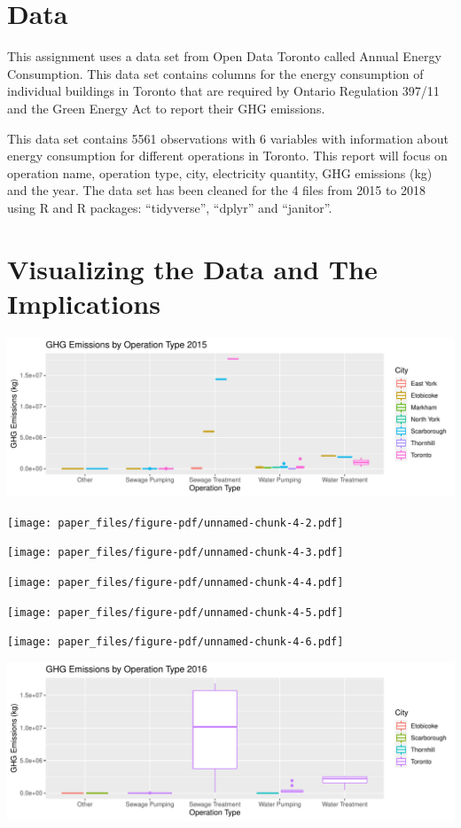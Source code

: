 \documentclass[
  letterpaper,
  DIV=11,
  numbers=noendperiod]{scrartcl}
\begin{document}
\pagebreak

\hypertarget{data}{%
\section{Data}\label{data}}

This assignment uses a data set from Open Data Toronto called Annual
Energy Consumption. This data set contains columns for the energy
consumption of individual buildings in Toronto that are required by
Ontario Regulation 397/11 and the Green Energy Act to report their GHG
emissions.

This data set contains 5561 observations with 6 variables with
information about energy consumption for different operations in
Toronto. This report will focus on operation name, operation type, city,
electricity quantity, GHG emissions (kg) and the year. The data set has
been cleaned for the 4 files from 2015 to 2018 using R and R packages:
``tidyverse'', ``dplyr'' and ``janitor''.

\hypertarget{visualizing-the-data-and-the-implications}{%
\section{Visualizing the Data and The
Implications}\label{visualizing-the-data-and-the-implications}}

\includegraphics{paper_files/figure-pdf/unnamed-chunk-4-1.pdf}

\texttt{[image: paper\_files/figure-pdf/unnamed-chunk-4-2.pdf]}

\texttt{[image: paper\_files/figure-pdf/unnamed-chunk-4-3.pdf]}

\texttt{[image: paper\_files/figure-pdf/unnamed-chunk-4-4.pdf]}

\texttt{[image: paper\_files/figure-pdf/unnamed-chunk-4-5.pdf]}

\texttt{[image: paper\_files/figure-pdf/unnamed-chunk-4-6.pdf]}

\includegraphics{paper_files/figure-pdf/unnamed-chunk-6-1.pdf}
\end{document}
